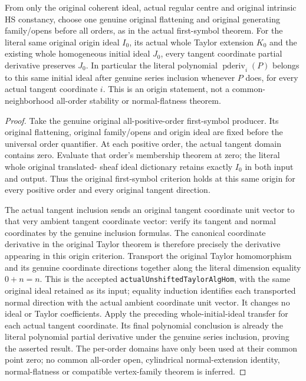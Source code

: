 \begin{theorem}
\label{hir:actual-original-hs-centre-whole-initial-tangent-pderiv}
\leanok
From only the original coherent ideal, actual regular centre and
original intrinsic HS constancy, choose one genuine original
flattening and original generating family/opens before all orders,
as in the actual first-symbol theorem. For the literal same original
origin ideal $I_0$, its actual whole Taylor extension $K_0$ and the
existing whole homogeneous initial ideal $J_0$, every tangent
coordinate partial derivative preserves $J_0$. In particular the
literal polynomial $\operatorname{pderiv}_{i}(P)$ belongs to this
same initial ideal after genuine series inclusion whenever $P$ does,
for every actual tangent coordinate $i$.
This is an origin statement, not a common-neighborhood all-order
stability or normal-flatness theorem.
\end{theorem}
\begin{proof}
Take the genuine original all-positive-order first-symbol producer.
Its original flattening, original family/opens and origin ideal are
fixed before the universal order quantifier. At each positive order,
the actual tangent domain contains zero. Evaluate that order's
membership theorem at zero; the literal whole original translated-
sheaf ideal dictionary retains exactly $I_0$ in both input and output.
Thus the original first-symbol criterion holds at this same origin
for every positive order and every original tangent direction.

The actual tangent inclusion sends an original tangent coordinate
unit vector to that very ambient tangent coordinate vector: verify
its tangent and normal coordinates by the genuine inclusion formulas.
The canonical coordinate derivative in the original Taylor theorem
is therefore precisely the derivative appearing in this origin
criterion. Transport the original Taylor homomorphism and its genuine
coordinate directions together along the literal dimension equality
$0+n=n$. This is the accepted \texttt{actualUnshiftedTaylorAlgHom},
with the same original ideal retained as its input; equality induction
identifies each transported normal direction with the actual ambient
coordinate unit vector. It changes no ideal or Taylor coefficients. Apply the preceding whole-initial-ideal transfer for
each actual tangent coordinate. Its final polynomial conclusion is
already the literal polynomial partial derivative under the genuine
series inclusion, proving the asserted result. The per-order domains
have only been used at their common point zero; no common all-order
open, cylindrical normal-extension identity, normal-flatness or
compatible vertex-family theorem is inferred.
\end{proof}

